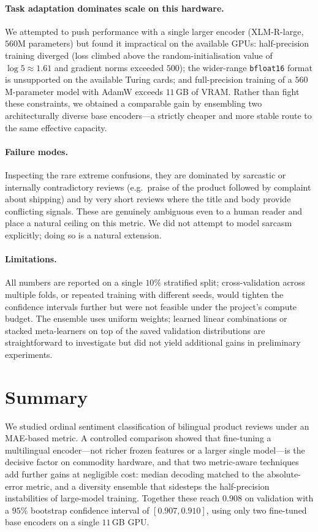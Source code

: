 \documentclass{article}
\theoremstyle{plain}
\theoremstyle{definition}
\theoremstyle{remark}
\begin{document}
\paragraph{Task adaptation dominates scale on this hardware.}
We attempted to push performance with a single larger encoder
(XLM-R-large, $560$M parameters) but found it impractical on the
available GPUs: half-precision training diverged
(loss climbed above the random-initialisation value of
$\log 5\approx 1.61$ and gradient norms exceeded $500$); the
wider-range \texttt{bfloat16} format is unsupported on the available
Turing cards; and full-precision training of a $560$M-parameter model
with AdamW exceeds $11$\,GB of VRAM. Rather than fight these
constraints, we obtained a comparable gain by ensembling two
architecturally diverse base encoders---a strictly cheaper and more
stable route to the same effective capacity.

\paragraph{Failure modes.}
Inspecting the rare extreme confusions, they are dominated by
sarcastic or internally contradictory reviews (e.g.\ praise of the
product followed by complaint about shipping) and by very short
reviews where the title and body provide conflicting signals. These
are genuinely ambiguous even to a human reader and place a natural
ceiling on this metric. We did not attempt to model sarcasm
explicitly; doing so is a natural extension.

\paragraph{Limitations.}
All numbers are reported on a single $10\%$ stratified split;
cross-validation across multiple folds, or repeated training with
different seeds, would tighten the confidence intervals further but
were not feasible under the project's compute budget. The
ensemble uses uniform weights; learned linear combinations or stacked
meta-learners on top of the saved validation distributions are
straightforward to investigate but did not yield additional gains in
preliminary experiments.

\section{Summary}
\label{sec:summary}
We studied ordinal sentiment classification of bilingual product
reviews under an MAE-based metric. A controlled comparison showed
that fine-tuning a multilingual encoder---not richer frozen features
or a larger single model---is the decisive factor on commodity
hardware, and that two metric-aware techniques add further gains at
negligible cost: median decoding matched to the absolute-error
metric, and a diversity ensemble that sidesteps the half-precision
instabilities of large-model training. Together these reach
$0.908$ on validation with a $95\%$ bootstrap confidence interval of
$[0.907,0.910]$, using only two fine-tuned base encoders on a single
$11$\,GB GPU.
\end{document}
